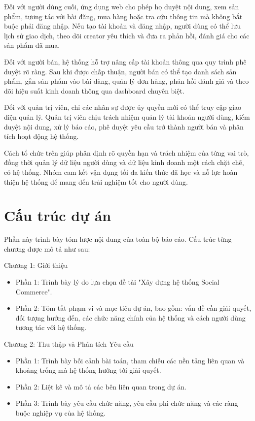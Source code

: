 Đối với người dùng cuối, ứng dụng web cho phép họ duyệt nội dung, xem sản phẩm, tương tác với bài đăng, mua hàng hoặc tra cứu thông tin mà không bắt buộc phải đăng nhập. Nếu tạo tài khoản và đăng nhập, người dùng có thể lưu lịch sử giao dịch, theo dõi creator yêu thích và đưa ra phản hồi, đánh giá cho các sản phẩm đã mua.

Đối với người bán, hệ thống hỗ trợ nâng cấp tài khoản thông qua quy trình phê duyệt rõ ràng. Sau khi được chấp thuận, người bán có thể tạo danh sách sản phẩm, gắn sản phẩm vào bài đăng, quản lý đơn hàng, phản hồi đánh giá và theo dõi hiệu suất kinh doanh thông qua dashboard chuyên biệt.

Đối với quản trị viên, chỉ các nhân sự được ủy quyền mới có thể truy cập giao diện quản lý. Quản trị viên chịu trách nhiệm quản lý tài khoản người dùng, kiểm duyệt nội dung, xử lý báo cáo, phê duyệt yêu cầu trở thành người bán và phân tích hoạt động hệ thống.

Cách tổ chức trên giúp phân định rõ quyền hạn và trách nhiệm của từng vai trò, đồng thời quản lý dữ liệu người dùng và dữ liệu kinh doanh một cách chặt chẽ, có hệ thống. Nhóm cam kết vận dụng tối đa kiến thức đã học và nỗ lực hoàn thiện hệ thống để mang đến trải nghiệm tốt cho người dùng.

\section{Cấu trúc dự án}
Phần này trình bày tóm lược nội dung của toàn bộ báo cáo. Cấu trúc từng chương được mô tả như sau:

Chương 1: Giới thiệu
\begin{itemize}
\item Phần 1: Trình bày lý do lựa chọn đề tài "Xây dựng hệ thống Social Commerce".
\item Phần 2: Tóm tắt phạm vi và mục tiêu dự án, bao gồm: vấn đề cần giải quyết, đối tượng hướng đến, các chức năng chính của hệ thống và cách người dùng tương tác với hệ thống.
\end{itemize}

Chương 2: Thu thập và Phân tích Yêu cầu
\begin{itemize}
\item Phần 1: Trình bày bối cảnh bài toán, tham chiếu các nền tảng liên quan và khoảng trống mà hệ thống hướng tới giải quyết.
\item Phần 2: Liệt kê và mô tả các bên liên quan trong dự án.
\item Phần 3: Trình bày yêu cầu chức năng, yêu cầu phi chức năng và các ràng buộc nghiệp vụ của hệ thống.
\end{itemize}

